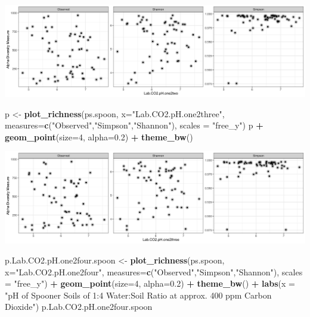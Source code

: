 \documentclass[]{article}
\newenvironment{Shaded}{\begin{snugshade}}{\end{snugshade}}
\newcommand{\DataTypeTok}[1]{\textcolor[rgb]{0.13,0.29,0.53}{#1}}
\newcommand{\DecValTok}[1]{\textcolor[rgb]{0.00,0.00,0.81}{#1}}
\newcommand{\FloatTok}[1]{\textcolor[rgb]{0.00,0.00,0.81}{#1}}
\newcommand{\KeywordTok}[1]{\textcolor[rgb]{0.13,0.29,0.53}{\textbf{#1}}}
\newcommand{\NormalTok}[1]{#1}
\newcommand{\OperatorTok}[1]{\textcolor[rgb]{0.81,0.36,0.00}{\textbf{#1}}}
\newcommand{\StringTok}[1]{\textcolor[rgb]{0.31,0.60,0.02}{#1}}
\begin{document}
\includegraphics{output-rmd/richness-ph-Lab.CO2.pH.one2two.spoon-1.png}

\begin{Shaded}
\begin{Highlighting}[]
\NormalTok{p <-}\StringTok{ }\KeywordTok{plot_richness}\NormalTok{(ps.spoon, }\DataTypeTok{x=}\StringTok{"Lab.CO2.pH.one2three"}\NormalTok{, }\DataTypeTok{measures=}\KeywordTok{c}\NormalTok{(}\StringTok{"Observed"}\NormalTok{,}\StringTok{"Simpson"}\NormalTok{,}\StringTok{"Shannon"}\NormalTok{), }\DataTypeTok{scales =} \StringTok{"free_y"}\NormalTok{)}
\NormalTok{p }\OperatorTok{+}\StringTok{ }\KeywordTok{geom_point}\NormalTok{(}\DataTypeTok{size=}\DecValTok{4}\NormalTok{, }\DataTypeTok{alpha=}\FloatTok{0.2}\NormalTok{) }\OperatorTok{+}\StringTok{ }\KeywordTok{theme_bw}\NormalTok{()}
\end{Highlighting}
\end{Shaded}

\includegraphics{output-rmd/richness-ph-Lab.CO2.pH.one2three.spoon-1.png}

\begin{Shaded}
\begin{Highlighting}[]
\NormalTok{p.Lab.CO2.pH.one2four.spoon <-}\StringTok{ }\KeywordTok{plot_richness}\NormalTok{(ps.spoon, }\DataTypeTok{x=}\StringTok{"Lab.CO2.pH.one2four"}\NormalTok{, }\DataTypeTok{measures=}\KeywordTok{c}\NormalTok{(}\StringTok{"Observed"}\NormalTok{,}\StringTok{"Simpson"}\NormalTok{,}\StringTok{"Shannon"}\NormalTok{), }\DataTypeTok{scales =} \StringTok{"free_y"}\NormalTok{) }\OperatorTok{+}\StringTok{ }\KeywordTok{geom_point}\NormalTok{(}\DataTypeTok{size=}\DecValTok{4}\NormalTok{, }\DataTypeTok{alpha=}\FloatTok{0.2}\NormalTok{) }\OperatorTok{+}\StringTok{ }\KeywordTok{theme_bw}\NormalTok{() }\OperatorTok{+}\StringTok{ }\KeywordTok{labs}\NormalTok{(}\DataTypeTok{x =} \StringTok{"pH of Spooner Soils of 1:4 Water:Soil Ratio at approx. 400 ppm Carbon Dioxide"}\NormalTok{)}
\NormalTok{p.Lab.CO2.pH.one2four.spoon}
\end{Highlighting}
\end{Shaded}
\end{document}
